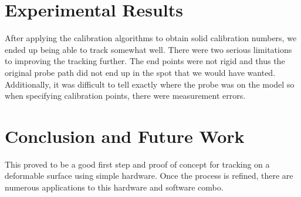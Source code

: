 \documentclass[conference]{acmsiggraph}
\begin{document}
\section{Experimental Results}

After applying the calibration algorithms to obtain solid calibration numbers, we ended up being able to track somewhat well. There were two serious limitations to improving the tracking further. The end points were not rigid and thus the original probe path did not end up in the spot that we would have wanted. Additionally, it was difficult to tell exactly where the probe was on the model so when specifying calibration points, there were measurement errors. 

\section{Conclusion and Future Work}

This proved to be a good first step and proof of concept for tracking on a deformable surface using simple hardware. Once the process is refined, there are numerous applications to this hardware and software combo. 






\end{document}
